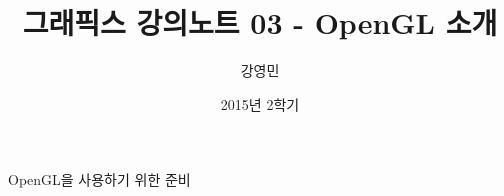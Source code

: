\documentclass{beamer}
\title[3D 그래픽스 프로그래밍]{그래픽스 강의노트 03 - OpenGL 소개}
\author{강영민}
\institute{동명대학교}
\date{2015년 2학기}
\begin{document}
\begin{frame}
  \titlepage
\end{frame}




%


\begin{frame}{OpenGL을 사용하기 위한 준비}


\end{frame}
\end{document}
